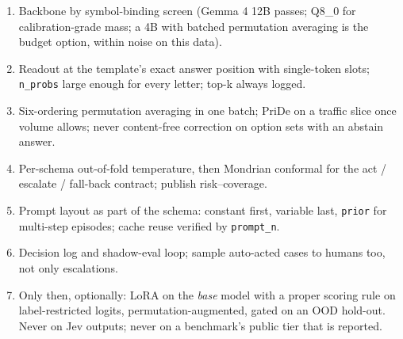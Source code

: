 \documentclass[11pt,a4paper]{article}
\newcommand{\code}[1]{\texttt{#1}}
\begin{document}
\begin{enumerate}
\item Backbone by symbol-binding screen (Gemma 4 12B passes; Q8\_0 for calibration-grade mass; a 4B with batched permutation averaging is the budget option, within noise on this data).
\item Readout at the template's exact answer position with single-token slots; \code{n\_probs} large enough for every letter; top-k always logged.
\item Six-ordering permutation averaging in one batch; PriDe on a traffic slice once volume allows; never content-free correction on option sets with an abstain answer.
\item Per-schema out-of-fold temperature, then Mondrian conformal for the act / escalate / fall-back contract; publish risk--coverage.
\item Prompt layout as part of the schema: constant first, variable last, \code{prior} for multi-step episodes; cache reuse verified by \code{prompt\_n}.
\item Decision log and shadow-eval loop; sample auto-acted cases to humans too, not only escalations.
\item Only then, optionally: LoRA on the \emph{base} model with a proper scoring rule on label-restricted logits, permutation-augmented, gated on an OOD hold-out. Never on Jev outputs; never on a benchmark's public tier that is reported.
\end{enumerate}

\end{document}
